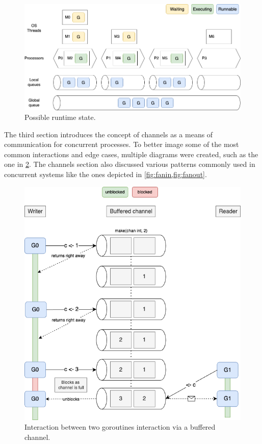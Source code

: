 \documentclass[
  digital,
  color,
  oneside,
  nosansbold,
  nocolorbold,
  nolof,
  nolot,
]{fithesis4}
\begin{document}
\begin{figure}[H]
    \centering
    \includegraphics[width=12cm]{figures/scheduling.png}
    \caption{Possible runtime state.}
    \label{fig:runtime}
\end{figure}

The third section introduces the concept of channels as a means of communication for concurrent processes. To better image some of the most common interactions and edge cases, multiple diagrams were created, such as the one in \cref{fig:goroutine-interactions}. The channels section also discussed various patterns commonly used in concurrent systems like the ones depicted in \cref{fig:fanin,fig:fanout}.

\begin{figure}[H]
    \centering
    \includegraphics[width=12cm]{figures/buffered-full.png}
    \caption{Interaction between two goroutines interaction via a buffered channel.}
    \label{fig:goroutine-interactions}
\end{figure}
\end{document}
